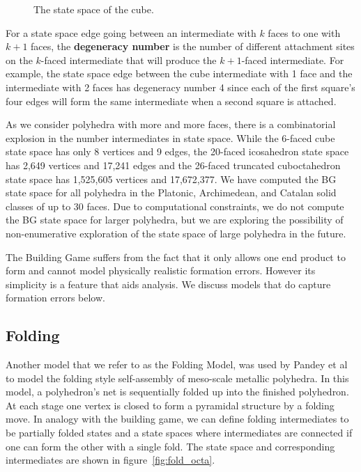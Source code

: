 \begin{figure}[h]
\caption{The state space of the cube.}
\label{fig:cube_bg}
\end{figure}




For a state space edge going between an intermediate with $k$ faces to one with $k+1$ faces, the \textbf{degeneracy number} is the number of different attachment sites on the $k$-faced intermediate that will produce the $k+1$-faced intermediate. For example, the state space edge between the cube intermediate with 1 face and the intermediate with 2 faces has degeneracy number 4 since each of the first square's four edges will form the same intermediate when a second square is attached. 


As we consider polyhedra with more and more faces, there is a combinatorial explosion in the number intermediates in state space. While the 6-faced cube state space has only 8 vertices and 9 edges, the 20-faced icosahedron state space has 2,649 vertices and 17,241 edges and the 26-faced truncated cuboctahedron state space has 1,525,605 vertices and 17,672,377. We have computed the BG state space for all polyhedra in the Platonic, Archimedean, and Catalan solid classes of up to 30 faces. Due to computational constraints, we do not compute the BG state space for larger polyhedra, but we are exploring the possibility of non-enumerative exploration of the state space of large polyhedra in the future. 

The Building Game suffers from the fact that it only allows one end product to form and cannot model physically realistic formation errors. However its simplicity is a feature that aids analysis. We discuss models that do capture formation errors below.  


\subsection{Folding}
Another model that we refer to as the Folding Model, was used by Pandey et al to model the folding style self-assembly of meso-scale metallic polyhedra. In this model, a polyhedron's net is sequentially folded up into the finished polyhedron. At each stage one vertex is closed to form a pyramidal structure by a folding move. In analogy with the building game, we can define folding intermediates to be partially folded states and a state spaces where intermediates are connected if one can form the other with a single fold. The state space and corresponding intermediates are shown in figure~\ref{fig:fold_octa}. 


